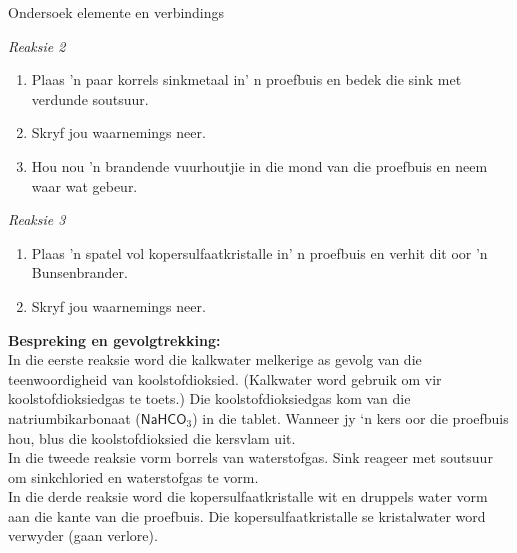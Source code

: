 \begin{g_experiment}{Ondersoek elemente en verbindings}
\begin{enumerate}[label=\textbf{\arabic*}.]
\end{enumerate}
\textsl{Reaksie 2}\\
\begin{enumerate}[label=\textbf{\arabic*}.]
\item Plaas 'n paar korrels sinkmetaal in' n proefbuis en bedek die sink met verdunde soutsuur.
\item Skryf jou waarnemings neer.
\item Hou nou 'n brandende vuurhoutjie in die mond van die proefbuis en neem waar wat gebeur. 
\end{enumerate}
\textsl{Reaksie 3}\\
\begin{enumerate}[label=\textbf{\arabic*}.]
\item Plaas 'n spatel vol kopersulfaatkristalle in' n proefbuis en verhit dit oor 'n Bunsenbrander.
\item Skryf jou waarnemings neer.
\end{enumerate}
\textbf{Bespreking en gevolgtrekking:}\\
 In die eerste reaksie word die kalkwater melkerige as gevolg van die teenwoordigheid van koolstofdioksied. (Kalkwater word gebruik om vir koolstofdioksiedgas te toets.) Die koolstofdioksiedgas kom van die natriumbikarbonaat ($\textsf{NaHCO}_3$) in die tablet. Wanneer jy ‘n kers oor die proefbuis hou, blus die koolstofdioksied die kersvlam uit.\\
In die tweede reaksie vorm borrels van waterstofgas. Sink reageer met soutsuur om sinkchloried en waterstofgas te vorm. \\
In die derde reaksie word die kopersulfaatkristalle wit en druppels water vorm aan die kante van die proefbuis. Die kopersulfaatkristalle se kristalwater word verwyder (gaan verlore).
\end{g_experiment}
